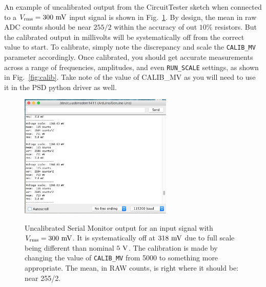 \documentclass[12pt]{article}
\begin{document}
An example of uncalibrated output from the CircuitTester sketch when connected to a $V_{\rm rms} = 300~\rm mV$ input signal is shown in Fig.~\ref{fig:uncalib}.   By design, the mean in raw ADC counts should be near $255/2$ within the accuracy of out $10\%$ resistors.  But the calibrated output in millivolts will be systematically off from the correct value to start.  To calibrate, simply note the discrepancy and scale the {\tt CALIB\_MV} parameter accordingly.  Once calibrated, you should get accurate measurements across a range of frequencies, amplitudes, and even {\tt RUN\_SCALE} settings, as shown in Fig.~\ref{fig:calib}.  Take note of the value of CALIB\_MV as you will need to use it in the PSD python driver as well.

\begin{figure}[htbp]
\begin{center}
{\includegraphics[width=0.65\textwidth]{figs/uncalibrated.png}}
\end{center}
\caption{\label{fig:uncalib} Uncalibrated Serial Monitor output for an input signal with $V_{\rm rms} = 300~\rm mV$.   It is systematically off at $318~\rm mV$ due to full scale being different than nominal $5~\rm V$.  The calibration is made by changing the value of {\tt CALIB\_MV} from 5000 to something more appropriate.
The mean, in RAW counts, is right where it should be:  near 255/2.}
\end{figure}
\end{document}
